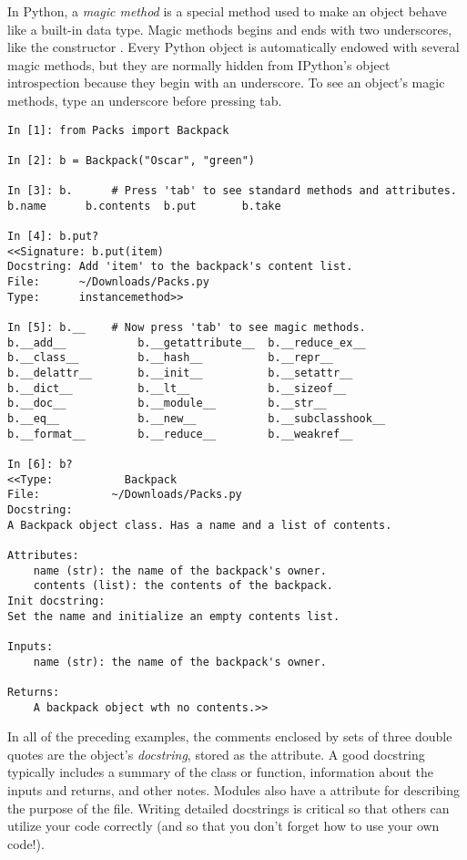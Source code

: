 In Python, a \emph{magic method} is a special method used to make an object behave like a built-in data type.
Magic methods begins and ends with two underscores, like the constructor .
Every Python object is automatically endowed with several magic methods, but they are normally hidden from IPython's object introspection because they begin with an underscore.
To see an object's magic methods, type an underscore before pressing tab.

\begin{lstlisting}
In [1]: from Packs import Backpack

In [2]: b = Backpack("Oscar", "green")

In [3]: b.      # Press 'tab' to see standard methods and attributes.
b.name      b.contents  b.put       b.take

In [4]: b.put?
<<Signature: b.put(item)
Docstring: Add 'item' to the backpack's content list.
File:      ~/Downloads/Packs.py
Type:      instancemethod>>

In [5]: b.__	# Now press 'tab' to see magic methods.
b.__add__           b.__getattribute__  b.__reduce_ex__
b.__class__         b.__hash__          b.__repr__
b.__delattr__       b.__init__          b.__setattr__
b.__dict__          b.__lt__            b.__sizeof__
b.__doc__           b.__module__        b.__str__
b.__eq__            b.__new__           b.__subclasshook__
b.__format__        b.__reduce__        b.__weakref__

In [6]: b?
<<Type:           Backpack
File:           ~/Downloads/Packs.py
Docstring:
A Backpack object class. Has a name and a list of contents.

Attributes:
    name (str): the name of the backpack's owner.
    contents (list): the contents of the backpack.
Init docstring:
Set the name and initialize an empty contents list.

Inputs:
    name (str): the name of the backpack's owner.

Returns:
    A backpack object wth no contents.>>
\end{lstlisting}

\begin{info}
In all of the preceding examples, the comments enclosed by sets of three double quotes are the object's \emph{docstring}, stored as the  attribute.
A good docstring typically includes a summary of the class or function, information about the inputs and returns, and other notes.
Modules also have a  attribute for describing the purpose of the file.
Writing detailed docstrings is critical so that others can utilize your code correctly (and so that you don't forget how to use your own code!).
\end{info}

